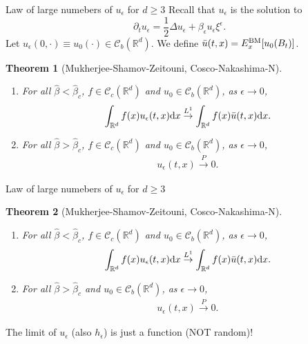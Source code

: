 \documentclass[10pt]{beamer}
\newtheorem{thm}{Theorem}
\newcommand{\R}{\mathbb{R}}
\newcommand{\e}{\epsilon}
\def\al#1{\begin{align*}#1\end{align*}}
\begin{document}
\begin{frame}{Law of large numebers of $u_{\epsilon}$ for $d\geq 3$}
  Recall that $u_{\epsilon}$ is the solution to
  $$\partial_t u_{\e}=\frac{1}{2}\Delta u_{\e}+\beta_{\e} u_{\epsilon}\xi^{\e}.$$
   Let $u_{\epsilon}(0,\cdot)\equiv u_0(\cdot)\in \mathcal{C}_b(\R^d)$. We define $\bar{u}(t,x)=E_x^{\rm BM}[u_0(B_t)]$.
  \begin{thm}[Mukherjee-Shamov-Zeitouni, Cosco-Nakashima-N]
    \begin{enumerate}
    \item For all $\hat{\beta}<\hat{\beta}_c$, $f\in\mathcal{C}_c(\R^d)$ and $u_0\in \mathcal{C}_b(\R^d)$, as $\e\to 0$,
      \al{ \int_{\R^d} f(x) u_{\epsilon}(t,x){\rm d} x\overset{L^1}{\rightarrow}      \int_{\R^d} f(x) \bar{u}(t,x){\rm d} x.
      }
      \item For all $\hat{\beta}> \hat{\beta}_c$, $f\in\mathcal{C}_c(\R^d)$ and $u_0\in \mathcal{C}_b(\R^d)$, as $\e\to 0$,
   \al{ u_{\epsilon}(t,x)\overset{P}{\rightarrow}    0.
      }  
      \end{enumerate}
    \end{thm}
  \end{frame}
\begin{frame}{Law of large numebers of $u_{\epsilon}$ for $d\geq 3$}
   \begin{thm}[Mukherjee-Shamov-Zeitouni, Cosco-Nakashima-N]
    \begin{enumerate}
    \item For all $\hat{\beta}<\hat{\beta}_c$, $f\in\mathcal{C}_c(\R^d)$ and $u_0\in \mathcal{C}_b(\R^d)$, as $\e\to 0$,
      \al{ \int_{\R^d} f(x) u_{\epsilon}(t,x){\rm d} x\overset{L^1}{\rightarrow}      \int_{\R^d} f(x) \bar{u}(t,x){\rm d} x.
      }
      \item For all $\hat{\beta}> \hat{\beta}_c$ and $u_0 \in \mathcal{C}_b(\R^d)$, as $\e\to 0$,
   \al{ u_{\epsilon}(t,x)\overset{P}{\rightarrow}    0.
      }  

\end{enumerate}
   \end{thm}
   \vspace{4mm}
   \begin{screen}
     The limit of $u_{\epsilon}$ (also $h_{\epsilon}$) is just a function {\color{red}(NOT random)}!
     \end{screen}
  \end{frame}
\end{document}
